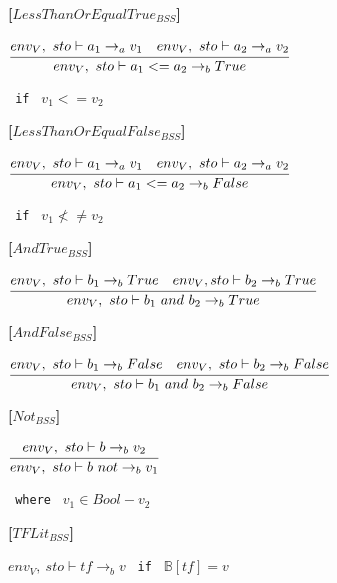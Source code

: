 \textbf{[$LessThanOrEqualTrue_{BSS}$]}\\
\begin{center}
	\begin{math}
	\cfrac
	{env_V,\ sto \vdash a_1 \rightarrow_a v_1 \quad env_V,\ sto \vdash a_2 \rightarrow_a v_2}
	{env_V,\ sto \vdash a_1 <= a_2 \rightarrow_b True}
	\end{math}
	
	\texttt{ if } $v_1 <= v_2$
\end{center}

\textbf{[$LessThanOrEqualFalse_{BSS}$]}\\
\begin{center}
	\begin{math}
	\cfrac
	{env_V,\ sto \vdash a_1 \rightarrow_a v_1 \quad env_V,\ sto \vdash a_2 \rightarrow_a v_2}
	{env_V,\ sto \vdash a_1 <= a_2 \rightarrow_b False}
	\end{math}
	
	\texttt{ if } $v_1 \not<\not= v_2$
\end{center}

\textbf{[$AndTrue_{BSS}$]}\\
\begin{center}
	\begin{math}
	\cfrac
		{env_V,\ sto \vdash b_1 \rightarrow_b True \quad env_V, sto \vdash b_2 \rightarrow_b True}
		{env_V,\ sto \vdash b_1\ and\ b_2 \rightarrow_b True}
	\end{math}
\end{center}

\textbf{[$AndFalse_{BSS}$]}\\
\begin{center}
	\begin{math}
	\cfrac
		{env_V,\ sto \vdash b_1 \rightarrow_b False \quad env_V,\ sto \vdash b_2 \rightarrow_b False}
		{env_V,\ sto \vdash b_1\ and\ b_2 \rightarrow_b False}
	\end{math}
\end{center}

\textbf{[$Not_{BSS}$]}\\
\begin{center}
	\begin{math}
	\cfrac
	{env_V,\ sto \vdash b \rightarrow_b v_2}
	{env_V,\ sto \vdash b\ not \rightarrow_b v_1}
	\end{math}
	
	\texttt{ where } $v_1 \in Bool - v_2$
\end{center}

\textbf{[$TFLit_{BSS}$]}\\
\begin{center}
	\begin{math}
	env_V,\ sto \vdash tf \rightarrow_b v
	\end{math}
	\texttt{ if } $\mathbb{B}[tf] = v$
\end{center}

